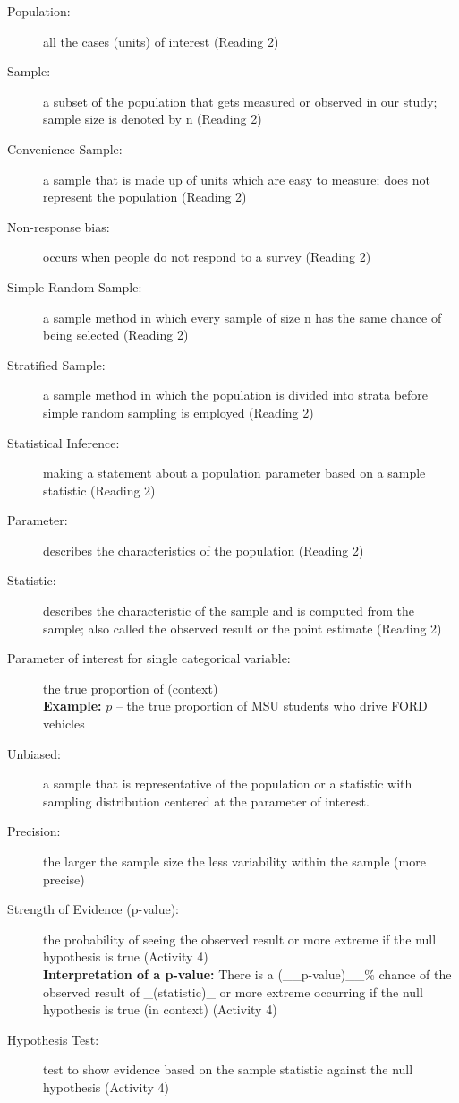 \begin{description}
\item[Population:] all the cases (units) of interest (Reading 2) 
\item [Sample:] a subset of the population that gets measured or
  observed in our study; sample size is denoted by n (Reading 2)
\item [Convenience Sample:] a sample that is made up of units which
  are easy to measure; does not represent the population (Reading 2)
\item [Non-response bias:] occurs when people do not respond to a
  survey (Reading 2)
\item [Simple Random Sample:] a sample method in which every sample of
  size n has the same chance of being selected (Reading 2) 
\item [Stratified Sample:] a sample method in which the population is
  divided into strata before simple random sampling is employed
  (Reading 2)
\item [Statistical Inference:] making a statement about a population
  parameter based on a sample statistic (Reading 2)
\item [Parameter:] describes the characteristics of the population (Reading 2)
\item [Statistic:] describes the characteristic of the sample and is
  computed from the sample; also called the observed result or the
  point estimate (Reading 2)
\item [Parameter of interest for single categorical variable:]  the
  true proportion of (context)\\
  {\bf Example:} $p$ – the true proportion of MSU students who drive
  FORD vehicles
\item [Unbiased:] a sample that is representative of the population or
  a statistic with sampling distribution centered at the parameter of interest. 
\item [Precision:]  the larger the sample size the less variability
  within the sample (more precise)
\item [Strength of Evidence (p-value):] the probability of seeing the
  observed result or more extreme if the null hypothesis is true
  (Activity 4)\\
   {\bf Interpretation of a p-value:} There is a (\_\_p-value)\_\_\% chance
   of the observed result of \_(statistic)\_ or more extreme occurring
   if the null hypothesis is true (in context) (Activity 4)
 \item [Hypothesis Test:] test to show evidence based on the sample
   statistic against the null hypothesis (Activity 4) \\

\end{description}
